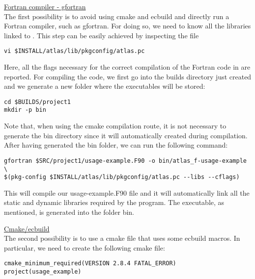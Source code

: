 \begin{description}
%
\item \underline{Fortran compiler - gfortran}\\
%
The first possibility is to 
avoid using cmake and ecbuild and directly run a Fortran compiler, 
such as gfortran. For doing so, we need to know all the libraries 
linked to \Atlas. This step can be easily achieved by inspecting 
the file 
%
\begin{lstlisting}[style=BashStyle]
vi $INSTALL/atlas/lib/pkgconfig/atlas.pc
\end{lstlisting}
%
Here, all the flags necessary for the correct compilation 
of the Fortran code in  are reported. For 
compiling the code, we first go into the builds directory 
just created and we generate a new folder where the executables 
will be stored: 
%
\begin{lstlisting}[style=BashStyle]
cd $BUILDS/project1
mkdir -p bin
\end{lstlisting}
%
Note that, when using the cmake compilation route, it is not 
necessary to generate the bin directory since it will automatically 
created during compilation.
After having generated the bin folder, we can run the following 
command:
%
\begin{lstlisting}[style=BashStyle]
gfortran $SRC/project1/usage-example.F90 -o bin/atlas_f-usage-example \ 
$(pkg-config $INSTALL/atlas/lib/pkgconfig/atlas.pc --libs --cflags)
\end{lstlisting}
%
This will compile our usage-example.F90 file and it will automatically 
link all the static and dynamic libraries required by the program. 
The executable, as mentioned, is generated into the folder bin.
%
\item \underline{Cmake/ecbuild}\\
%
The second possibility is to use a cmake file that uses some 
ecbuild macros. In particular, we need to create the following 
cmake file:
%
\begin{lstlisting}[style=XMLStyle]
cmake_minimum_required(VERSION 2.8.4 FATAL_ERROR)
project(usage_example)


\end{lstlisting}
\end{description}
